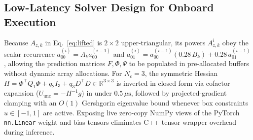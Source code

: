 \documentclass[10pt,a4paper]{article}
\begin{document}
\begin{table}[h!]
\centering
\footnotesize
\caption{Benchmark Suite II (Stage 3): Storm-Wind Performance Across 30 Unseen $[0, 1000]$ Trajectories with Injected Gusts (Peak $1.03\,\text{m/s}^2$, Mean $\pm$ Std).}
\label{tab:stage2}
\end{table}

\subsection{Low-Latency Solver Design for Onboard Execution}
Because $A_{z,k}$ in Eq.~\ref{eq:lifted} is $2 \times 2$ upper-triangular, its powers $A_{z,k}^i$ obey the scalar recurrence $a_{00}^{(i)} = A_k a_{00}^{(i-1)}$ and $a_{01}^{(i)} = a_{00}^{(i-1)}(0.28\,B_k) + 0.28\,a_{01}^{(i-1)}$, allowing the prediction matrices $F, \Phi, \Psi$ to be populated in pre-allocated buffers without dynamic array allocations. For $N_c = 3$, the symmetric Hessian $H = \Phi^\top Q_1 \Phi + q_2 I_3 + q_3 D^\top D \in \mathbb{R}^{3 \times 3}$ is inverted in closed form via cofactor expansion ($U_{\text{unc}} = -H^{-1}g$) in under $0.5\,\mu\text{s}$, followed by projected-gradient clamping with an $O(1)$ Gershgorin eigenvalue bound whenever box constraints $u \in [-1, 1]$ are active. Exposing live zero-copy NumPy views of the PyTorch \texttt{nn.Linear} weight and bias tensors eliminates C++ tensor-wrapper overhead during inference.
\end{document}
